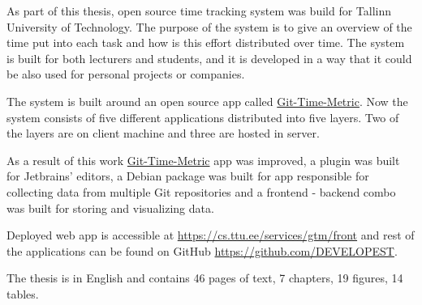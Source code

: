 As part of this thesis, open source time tracking system was build for Tallinn University of Technology.
The purpose of the system is to give an overview of the time put into each task and how is
this effort distributed over time.
The system is built for both lecturers and students, and it is developed in a way that it
could be also used for personal projects or companies.

The system is built around an open source app called \href{https://github.com/git-time-metric/gtm}{Git-Time-Metric}.
Now the system consists of five different applications distributed into five layers.
Two of the layers are on client machine and three are hosted in server.

As a result of this work \href{https://github.com/git-time-metric/gtm}{Git-Time-Metric} app was improved,
a plugin was built for Jetbrains' editors,
a Debian package was built for app responsible for collecting data from multiple Git repositories
and a frontend - backend combo was built for storing and visualizing data.

Deployed web app is accessible at \href{https://cs.ttu.ee/services/gtm/front}{https://cs.ttu.ee/services/gtm/front}
and rest of the applications can be found on GitHub \href{https://github.com/DEVELOPEST}{https://github.com/DEVELOPEST}.

The thesis is in English and contains 46 pages of text, 7 chapters, 19 figures, 14 tables.